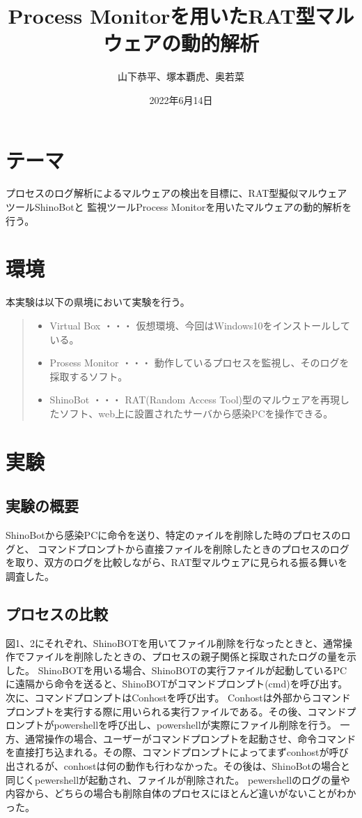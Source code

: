 \documentclass[dvipdfmx,autodetect-engine]{jsarticle}
\title{Process Monitorを用いたRAT型マルウェアの動的解析}
\author{山下恭平、塚本覇虎、奥若菜}
\date{2022年6月14日}
\begin{document}
 
 \maketitle

\section{テーマ}
プロセスのログ解析によるマルウェアの検出を目標に、RAT型擬似マルウェアツールShinoBotと
監視ツールProcess Monitorを用いたマルウェアの動的解析を行う。\\

\section{環境}
本実験は以下の県境において実験を行う。
\begin{quote}
  \begin{itemize}
   \item Virtual Box ・・・ 仮想環境、今回はWindows10をインストールしている。
   \item Prosess Monitor ・・・ 動作しているプロセスを監視し、そのログを採取するソフト。
   \item ShinoBot ・・・        RAT(Random Access Tool)型のマルウェアを再現したソフト、web上に設置されたサーバから感染PCを操作できる。
  \end{itemize}
 \end{quote}

\section{実験}
\subsection{実験の概要}
ShinoBotから感染PCに命令を送り、特定のァイルを削除した時のプロセスのログと、
コマンドプロンプトから直接ファイルを削除したときのプロセスのログを取り、双方のログを比較しながら、RAT型マルウェアに見られる振る舞いを調査した。\\


\subsection{プロセスの比較}
図1、2にそれぞれ、ShinoBOTを用いてファイル削除を行なったときと、通常操作でファイルを削除したときの、プロセスの親子関係と採取されたログの量を示した。
ShinoBOTを用いる場合、ShinoBOTの実行ファイルが起動しているPCに遠隔から命令を送ると、ShinoBOTがコマンドプロンプト(cmd)を呼び出す。次に、コマンドプロンプトはConhostを呼び出す。
Conhostは外部からコマンドプロンプトを実行する際に用いられる実行ファイルである。その後、コマンドプロンプトがpowershellを呼び出し、powershellが実際にファイル削除を行う。
一方、通常操作の場合、ユーザーがコマンドプロンプトを起動させ、命令コマンドを直接打ち込まれる。その際、コマンドプロンプトによってまずconhostが呼び出されるが、conhostは何の動作も行わなかった。その後は、ShinoBotの場合と同じくpewershellが起動され、ファイルが削除された。
pewershellのログの量や内容から、どちらの場合も削除自体のプロセスにほとんど違いがないことがわかった。\\\\
\end{document}
